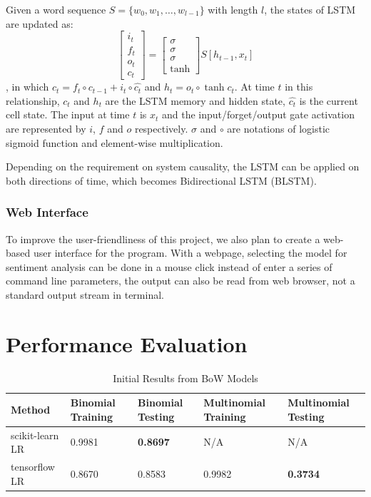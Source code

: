 \documentclass[conference]{IEEEtran}
\begin{document}
    Given a word sequence $S=\{w_0,w_1,\ldots,w_{l-1}\}$ with length $l$, the states
    of LSTM are updated as:
    $$
    \begin{bmatrix} 
    i_t\\f_t\\o_t\\c_t 
    \end{bmatrix} = 
    \begin{bmatrix}
    \sigma\\\sigma\\\sigma\\\tanh
    \end{bmatrix}
    S[h_{t-1},x_t]
    $$
    , in which $c_t=f_t\circ c_{t-1} + i_t\circ\hat{c_t}$ and $h_t=o_t\circ\tanh{c_t}$.
    At time $t$ in this relationship, $c_t$ and $h_t$ are the LSTM memory and 
    hidden state, $\hat{c_t}$ is the current cell state. The input at time $t$ 
    is $x_t$ and the input/forget/output gate activation are represented by $i$, 
    $f$ and $o$ respectively. $\sigma$ and $\circ$ are notations of logistic 
    sigmoid function and element-wise multiplication\cite{zhou2016text}.
    
    Depending on the requirement on system causality, the LSTM can be applied on
    both directions of time, which becomes Bidirectional LSTM 
    (BLSTM)\cite{schuster1997bidirectional,barnes2017assessing}.

\subsubsection{Web Interface}
\label{model:stretch:web}
    To improve the user-friendliness of this project, we also plan to create a 
    web-based user interface for the program. With a webpage, selecting
    the model for sentiment analysis can be done in a mouse click instead of 
    enter a series of command line parameters, the output can also
    be read from web browser, not a standard output stream in terminal. 

\section{Performance Evaluation}
\label{performance}
    \begin{table}[]
        \centering
        \caption{Initial Results from BoW Models}
        \label{my-label}
        \begin{tabularx}{\textwidth}{ X  X  X X  X }
        \toprule
        Method & Binomial Training & Binomial Testing & Multinomial Training & Multinomial Testing \\
        \midrule
        scikit-learn LR & 0.9981 & \textbf{0.8697} & N/A & N/A \\
        tensorflow LR & 0.8670 & 0.8583 & 0.9982 & \textbf{0.3734} \\
        \bottomrule
        \end{tabularx}
    \end{table}
\end{document}

